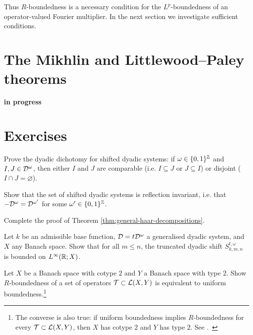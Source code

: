 Thus $R$-boundedness is a necessary condition for the $L^p$-boundedness of an operator-valued Fourier multiplier.
In the next section we investigate sufficient conditions.

\section{The Mikhlin and Littlewood--Paley  theorems}

\textbf{in progress}

\section{Exercises}

\begin{exercise}\label{ex:dyadic-dichotomy}
  Prove the dyadic dichotomy for shifted dyadic systems: if $\omega \in \{0,1\}^{\mathbb{Z}}$ and $I,J \in \mathcal{D}^{\omega}$, then either $I$ and $J$ are comparable (i.e. $I \subseteq J$ or $J \subseteq I$) or disjoint ($I \cap J = \varnothing$).
\end{exercise}

\begin{exercise}\label{ex:dyadic-refln-invariance}
  Show that the set of shifted dyadic systems is reflection invariant, i.e. that $-\mathcal{D}^{\omega} = \mathcal{D}^{\omega'}$ for some $\omega' \in \{0,1\}^{\mathbb{Z}}$.
\end{exercise}

\begin{exercise}\label{ex:mgale-reduction}
  Complete the proof of Theorem \ref{thm:general-haar-decompositions}.
\end{exercise}

\begin{exercise}
  Let $k$ be an admissible base function, $\mathcal{D} = t\mathcal{D}^{\omega}$ a generalised dyadic system, and $X$ any Banach space.
  Show that for all $m \leq n$, the truncated dyadic shift $S_{k,m,n}^{t,\omega}$ is bounded on $L^\infty(\mathbb{R};X)$.
\end{exercise}

\begin{exercise}\label{ex:R-bound-type}
  Let $X$ be a Banach space with cotype $2$ and $Y$ a Banach space with type $2$.
  Show $R$-boundedness of a set of operators $\mathcal{T} \subset \mathcal{L}(X,Y)$ is equivalent to uniform boundedness.\footnote{The converse is also true: if uniform boundedness implies $R$-boundedness for every $\mathcal{T} \subset \mathcal{L}(X,Y)$, then $X$ has cotype $2$ and $Y$ has type $2$. See \cite[Proposition 8.6.1]{HNVW17}.\ }
\end{exercise}

